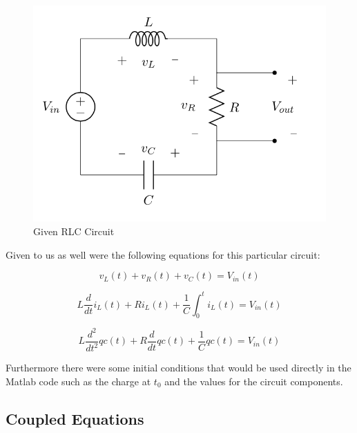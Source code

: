 \documentclass[a4paper, 12pt]{article}
\begin{document}
\begin{figure}[h]
\centering
\includegraphics[width=\textwidth]{ex3/RLCCircuit.png}
\caption{Given RLC Circuit}
\end{figure}

Given to us as well were the following equations for this particular circuit:

\begin{equation}\label{firstRLC}
v_{L}(t) + v_{R}(t) + v_{C}(t) = V_{in}(t)
\end{equation}

\begin{equation}\label{secondRLC}
L \frac{d}{dt}i_{L}(t) + Ri_{L}(t) + \frac{1}{C} \int_{0}^{t} i_{L}(t) = V_{in}(t)
\end{equation}

\begin{equation}\label{thirdRLC}
L \frac{d^2}{dt^2}qc(t) + R\frac{d}{dt}qc(t) + \frac{1}{C} qc(t) = V_{in}(t)
\end{equation}

Furthermore there were some initial conditions that would be used directly in the Matlab code such as the charge at $t_{0}$ and the values for the circuit components.

\subsection{Coupled Equations}\cite{coupledequations}
\end{document}
